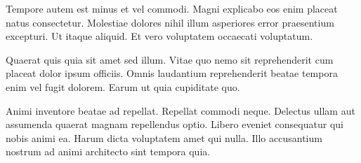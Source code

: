 Tempore autem est minus et vel commodi. Magni explicabo eos enim placeat natus consectetur. Molestiae dolores nihil illum asperiores error praesentium excepturi. Ut itaque aliquid. Et vero voluptatem occaecati voluptatum.
 
Quaerat quis quia sit amet sed illum. Vitae quo nemo sit reprehenderit cum placeat dolor ipsum officiis. Omnis laudantium reprehenderit beatae tempora enim vel fugit dolorem. Earum ut quia cupiditate quo.
 
Animi inventore beatae ad repellat. Repellat commodi neque. Delectus ullam aut assumenda quaerat magnam repellendus optio. Libero eveniet consequatur qui nobis animi ea. Harum dicta voluptatem amet qui nulla. Illo accusantium nostrum ad animi architecto sint tempora quia.\cite{CleanCode}